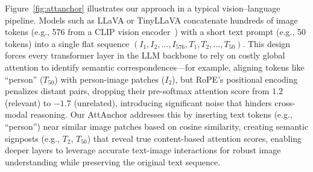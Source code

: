 \documentclass[11pt]{article}
\begin{document}
Figure~\ref{fig:attanchor} illustrates our approach in a typical vision–language pipeline. Models such as LLaVA or TinyLLaVA concatenate hundreds of image tokens (e.g., 576 from a CLIP vision encoder~\citep{radford2021learning}) with a short text prompt (e.g., 50 tokens) into a single flat sequence
$(I_{1}, I_{2}, \dots, I_{576}, T_{1}, T_{2}, \dots, T_{50})$.
This design forces every transformer layer in the LLM backbone to rely on costly global attention to identify semantic correspondences—for example, aligning  tokens like ``person'' ($T_{50}$) with person-image patches ($I_{2}$), but RoPE’s positional encoding penalizes distant pairs, dropping their pre-softmax attention score from $1.2$ (relevant) to $-1.7$ (unrelated), introducing significant noise that hinders cross-modal reasoning. Our AttAnchor addresses this by inserting text tokens (e.g., ``person'') near similar image patches based on cosine similarity, creating semantic signposts (e.g., $T_{2}$, $T_{50}$) that reveal true content-based attention scores, enabling deeper layers to leverage accurate text-image interactions for robust image understanding while preserving the original text sequence.
\end{document}

